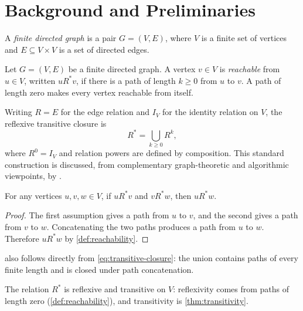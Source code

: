 \chapter{Background and Preliminaries}
\label{ch:background}


\begin{definition}
\label{def:directed-graph}
A \emph{finite directed graph} is a pair $G=(V,E)$, where $V$ is a finite set of
vertices and $E\subseteq V\times V$ is a set of directed edges.
\end{definition}

\begin{definition}[Reachability]
\label{def:reachability}
Let $G=(V,E)$ be a finite directed graph. A vertex $v\in V$ is
\emph{reachable} from $u\in V$, written $u\mathrel{R^*}v$, if there is a path
of length $k\geq 0$ from $u$ to $v$. A path of length zero makes every vertex
reachable from itself.
\end{definition}

Writing $R=E$ for the edge relation and $I_V$ for the identity relation on
$V$, the reflexive transitive closure is
\begin{equation}
  R^* = \bigcup_{k\geq 0} R^k,
  \label{eq:transitive-closure}
\end{equation}
where $R^0=I_V$ and relation powers are defined by composition. This standard
construction is discussed, from complementary graph-theoretic and algorithmic
viewpoints, by \cite{diestel2017,cormen2022}.

\begin{theorem}
\label{thm:transitivity}
For any vertices $u,v,w\in V$, if $u\mathrel{R^*}v$ and
$v\mathrel{R^*}w$, then $u\mathrel{R^*}w$.
\end{theorem}

\begin{proof}
The first assumption gives a path from $u$ to $v$, and the second gives a path
from $v$ to $w$. Concatenating the two paths produces a path from $u$ to $w$.
Therefore $u\mathrel{R^*}w$ by \cref{def:reachability}.
\end{proof}

 also follows directly from \cref{eq:transitive-closure}:
the union contains paths of every finite length and is closed under path
concatenation.

\begin{corollary}
\label{cor:preorder}
The relation $R^*$ is reflexive and transitive on $V$: reflexivity comes from
paths of length zero (\cref{def:reachability}), and transitivity is
\cref{thm:transitivity}.
\end{corollary}
